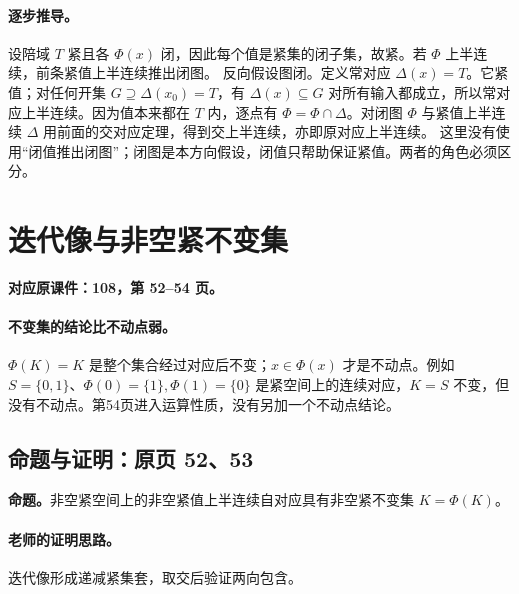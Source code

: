 \documentclass[11pt,a4paper]{article}
\theoremstyle{definition}\newtheorem{definition}{定义}\newtheorem{example}{例}
\begin{document}
\paragraph{逐步推导。}
设陪域 $T$ 紧且各 $\Phi(x)$ 闭，因此每个值是紧集的闭子集，故紧。若 $\Phi$ 上半连续，前条紧值上半连续推出闭图。
反向假设图闭。定义常对应 $\Delta(x)=T$。它紧值；对任何开集 $G\supseteq\Delta(x_0)=T$，有 $\Delta(x)\subseteq G$ 对所有输入都成立，所以常对应上半连续。因为值本来都在 $T$ 内，逐点有 $\Phi=\Phi\cap\Delta$。对闭图 $\Phi$ 与紧值上半连续 $\Delta$ 用前面的交对应定理，得到交上半连续，亦即原对应上半连续。
这里没有使用“闭值推出闭图”；闭图是本方向假设，闭值只帮助保证紧值。两者的角色必须区分。


\clearpage\section{迭代像与非空紧不变集}\label{g:108:52}

\textbf{对应原课件：108，第 52--54 页。}


\paragraph{不变集的结论比不动点弱。}
$\Phi(K)=K$ 是整个集合经过对应后不变；$x\in\Phi(x)$ 才是不动点。例如 $S=\{0,1\}$、$\Phi(0)=\{1\},\Phi(1)=\{0\}$ 是紧空间上的连续对应，$K=S$ 不变，但没有不动点。第54页进入运算性质，没有另加一个不动点结论。


\subsection{命题与证明：原页 52、53}

\textbf{命题。}非空紧空间上的非空紧值上半连续自对应具有非空紧不变集 $K=\Phi(K)$。

\paragraph{老师的证明思路。}迭代像形成递减紧集套，取交后验证两向包含。
\end{document}
